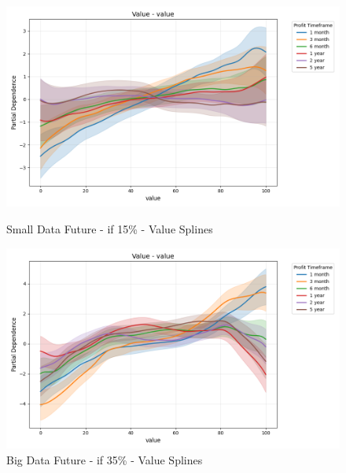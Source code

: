 \documentclass[11pt,english,a4paper,hidelinks]{book}
\begin{document}
\begin{figure}[H]
    \centering
    \begin{minipage}{0.48\textwidth}
        \centering
        \includegraphics[width=\textwidth]{images/code/models/general_regression/splines/2D/Small Data future - IF/value_value.png}
        \caption{Small Data Future - \acrshort{if} 15\% - Value Splines}
        \label{fig:spline_value_value}
    \end{minipage}\hfill
    \begin{minipage}{0.48\textwidth}
        \centering
        \includegraphics[width=\textwidth]{images/code/models/general_regression/splines/2D/Big Data future - IF HARD Balanced/value_value.png}
        \caption{Big Data Future - \acrshort{if} 35\% - Value Splines}
        \label{fig:spline_value_value_balanced}
    \end{minipage}
\end{figure}
\end{document}
